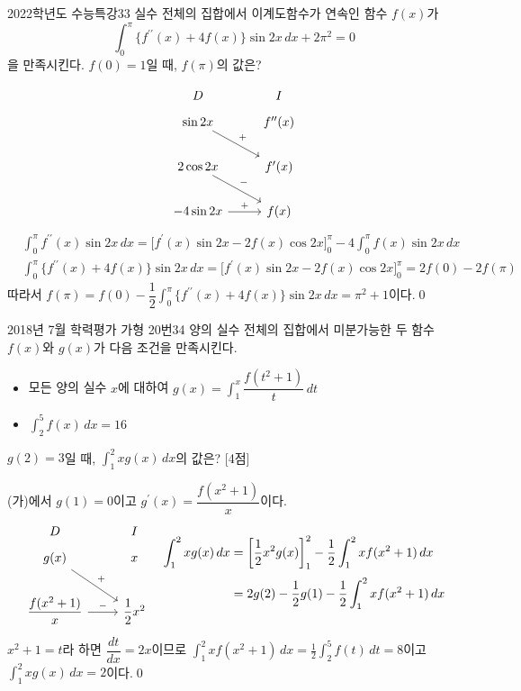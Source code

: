 \documentclass{article}
\begin{document}
\newpage
\begin{prob}{2022학년도 수능특강}{33}
	실수 전체의 집합에서 이계도함수가 연속인 함수 $f(x)$가
	\[
		\int_0^\pi\{f^{\prime\prime}(x)+4f(x)\}\sin 2x\,dx+2\pi^2=0
	\]
	을 만족시킨다. $f(0)=1$일 때, $f(\pi)$의 값은?
\end{prob}

\begin{sol}
	\[
		\begin{tikzcd}
			D & I \\[-12pt]
			\sin 2x \arrow[rd, "+"] & f^{\prime\prime}(x) \\
			2\cos 2x \arrow[rd, "-"] & f^\prime(x) \\
			-4\sin 2x \arrow[r, "+"] & f(x)
		\end{tikzcd}
	\]
	\[
		\begin{aligned}
			&\int_0^\pi f^{\prime\prime}(x)\sin 2x\,dx=\biggl[f^{\prime}(x)\sin2x-2f(x)\cos2x\biggr]_0^\pi-4\int_0^\pi f(x)\sin2x\,dx\\[3pt]
			&\int_0^\pi\{f^{\prime\prime}(x)+4f(x)\}\sin2x\,dx=\biggl[f^{\prime}(x)\sin2x-2f(x)\cos2x\biggr]_0^\pi=2f(0)-2f(\pi)
		\end{aligned}
	\]
	따라서 $f(\pi)=f(0)-\dfrac{1}{2}\displaystyle\int_0^\pi\{f^{\prime\prime}(x)+4f(x)\}\sin2x\,dx=\pi^2+1$이다.\qed
\end{sol}

\newpage
\begin{prob}{2018년 7월 학력평가 가형 20번}{34}
	양의 실수 전체의 집합에서 미분가능한 두 함수 $f(x)$와 $g(x)$가 다음 조건을 만족시킨다.
	\begin{hint}
		\begin{itemize}
			\item[(가)] 모든 양의 실수 $x$에 대하여 $g(x)=\displaystyle\int_1^x\dfrac{f(t^2+1)}{t}\,dt$
			\item[(나)] $\displaystyle\int_2^5f(x)\,dx=16$
		\end{itemize}
	\end{hint}
	$g(2)=3$일 때, $\displaystyle\int_1^2xg(x)\,dx$의 값은? [4점]
\end{prob}

\begin{sol}
	(가)에서 $g(1)=0$이고 $g^\prime(x)=\dfrac{f(x^2+1)}{x}$이다.
	\[
		\begin{tikzcd}
			D & I \\[-12pt]
			g(x) \arrow[rd, "+"] & x \\
			\dfrac{f(x^2+1)}{x} \arrow[r, "-"] & \dfrac{1}{2}x^2
		\end{tikzcd}\quad\begin{aligned}
			\int_1^2xg(x)\,dx&=\biggl[\frac{1}{2}x^2g(x)\biggr]_1^2-\frac{1}{2}\int_1^2xf(x^2+1)\,dx\\[3pt]
			&=2g(2)-\frac{1}{2}g(1)-\frac{1}{2}\int_1^2xf(x^2+1)\,dx
		\end{aligned}
	\]
	$x^2+1=t$라 하면 $\dfrac{dt}{dx}=2x$이므로 $\displaystyle\int_1^2xf(x^2+1)\,dx=\frac{1}{2}\int_2^5f(t)\,dt=8$이고 $\displaystyle\int_1^2xg(x)\,dx=2$이다.\qed
\end{sol}
\end{document}
